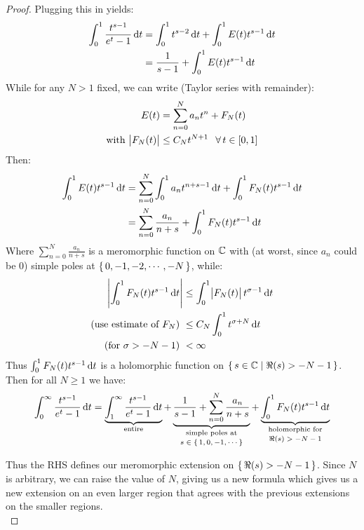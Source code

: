 \begin{proof}
Plugging this in yields:
\begin{align*}
    \int_0^1 \frac{t^{s-1}}{e^t - 1}  \dif t &= \int_0^1 t^{s-2} \dif t + \int_0^1 E(t) t^{s-1}  \dif t\\
    &= \frac{1}{s-1} + \int_0^1 E(t) t^{s-1}  \dif t
\end{align*}
While for any $N > 1$ fixed, we can write (Taylor series with remainder):
\begin{align*}
    E(t) &= \sum_{n=0}^N a_n t^n + F_N(t)\\
    \text{with } \abs{F_N(t)} &\leq C_N t^{N+1} \;\;\, \forall \, t \in [0,1]
\end{align*}
Then:
\begin{align*}
    \int_0^1 E(t) t^{s-1}  \dif t &= \sum_{n=0}^N \int_0^1 a_n t^{n+s-1} \dif t + \int_0^1 F_N(t) t^{s-1} \dif t\\
    &= \sum_{n=0}^N \frac{a_n}{n+s} + \int_0^1 F_N(t) t^{s-1} \dif t
\end{align*}
Where $\sum_{n=0}^N \frac{a_n}{n+s}$ is a meromorphic function on $\mathbb{C}$ with (at worst, since $a_n$ could be $0$) simple poles at $\set{0,-1,-2, \cdots ,-N}$, while:
\begin{align*}
    \abs{\int_0^1 F_N(t) t^{s-1} \dif t} &\leq \int_0^1 \abs{F_N(t)} t^{\sigma-1} \dif t\\
    \text{(use estimate of $F_N$) }&\leq C_N \int_0^1 t^{\sigma+N} \dif t\\
    \text{(for $\sigma > -N-1$) }&< \infty
\end{align*}
Thus $\int_0^1 F_N(t) t^{s-1} \dif t$ is a holomorphic function on $\set{s \in \mathbb{C}\mid \Re(s) > -N - 1}$.\\

Then for all $N \geq 1$ we have:
\begin{align}
    \int_0^\infty \frac{t^{s-1}}{e^t - 1}  \dif t =  \underbrace{\int_1^\infty \frac{t^{s-1}}{e^t - 1}  \dif t}_{\text{entire}} + \underbrace{\frac{1}{s-1} + \sum_{n=0}^N \frac{a_n}{n+s}}_{\text{\stackanchor{simple poles at}{$s \in \set{1,0, -1, \cdots}$}}} + \underbrace{\int_0^1 F_N(t) t^{s-1} \dif t}_{\text{\stackanchor{holomorphic for}{$\Re(s) > -N -1$}}}
\end{align}

Thus the RHS defines our meromorphic extension on $\set{\Re(s) > -N - 1}$. Since $N$ is arbitrary, we can raise the value of $N$, giving us a new formula which gives us a new extension on an even larger region that agrees with the previous extensions on the smaller regions.\\


\end{proof}
